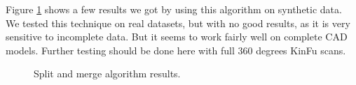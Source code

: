 \documentclass{article}
\begin{document}
Figure \ref{fig:split_merge} shows a few results we got by using this algorithm on synthetic data. We tested this technique on real datasets, but with no good results, as it is very sensitive to incomplete data. But it seems to work fairly well on complete CAD models. Further testing should be done here with full 360 degrees KinFu scans.

\begin{figure}
\centering
{}


\caption {Split and merge algorithm results.}
\label{fig:split_merge}
\end{figure}
\end{document}
